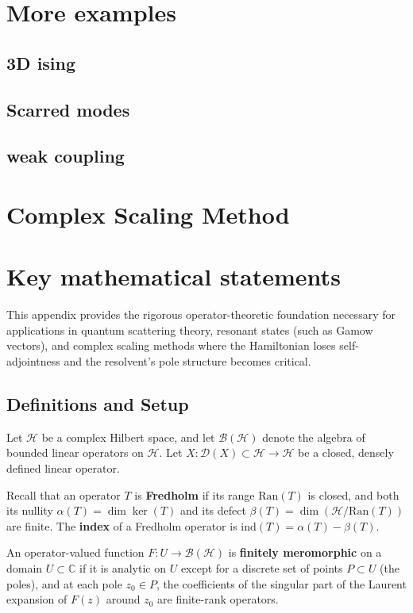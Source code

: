 \documentclass[JHEP,12pt]{article}
\begin{document}
\section{More examples}
\subsection{3D ising}
\subsection{Scarred modes}
\subsection{weak coupling}


\appendix

\section{Complex Scaling Method}



\section{Key mathematical statements}

This appendix provides the rigorous operator-theoretic foundation necessary for applications in quantum scattering theory, resonant states (such as Gamow vectors), and complex scaling methods where the Hamiltonian loses self-adjointness and the resolvent's pole structure becomes critical.

\subsection{Definitions and Setup}
Let $\mathcal{H}$ be a complex Hilbert space, and let $\mathcal{B}(\mathcal{H})$ denote the algebra of bounded linear operators on $\mathcal{H}$. Let $X: \mathcal{D}(X) \subset \mathcal{H} \to \mathcal{H}$ be a closed, densely defined linear operator. 

Recall that an operator $T$ is \textbf{Fredholm} if its range $\text{Ran}(T)$ is closed, and both its nullity $\alpha(T) = \dim \ker(T)$ and its defect $\beta(T) = \dim(\mathcal{H} / \text{Ran}(T))$ are finite. The \textbf{index} of a Fredholm operator is $\text{ind}(T) = \alpha(T) - \beta(T)$.

An operator-valued function $F: U \to \mathcal{B}(\mathcal{H})$ is \textbf{finitely meromorphic} on a domain $U \subset \mathbb{C}$ if it is analytic on $U$ except for a discrete set of points $P \subset U$ (the poles), and at each pole $z_0 \in P$, the coefficients of the singular part of the Laurent expansion of $F(z)$ around $z_0$ are finite-rank operators.
\end{document}
